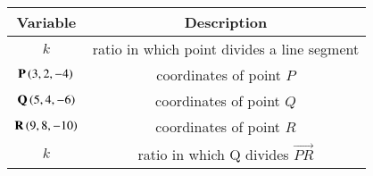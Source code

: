 \begin{tabular}[12pt]{ |c| c|}
    \hline
        \textbf{Variable}  & \textbf{Description}\\
    \hline
        $k$ &  ratio in which point divides a line segment\\
    \hline 
        $\mathbf{P}\left(3,2,-4\right)$ & coordinates of point $P$\\
    \hline
	$\mathbf{Q}\left(5,4,-6\right)$ & coordinates of point $Q$\\
    \hline
	$\mathbf{R}\left(9,8,-10\right)$ & coordinates of point $R$\\
    \hline
	$k$ & ratio in which Q divides $\vec{PR}$\\
    \hline 
\end{tabular}

